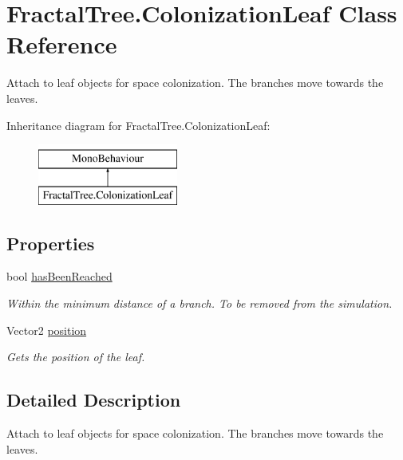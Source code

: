 \hypertarget{class_fractal_tree_1_1_colonization_leaf}{}\section{Fractal\+Tree.\+Colonization\+Leaf Class Reference}
\label{class_fractal_tree_1_1_colonization_leaf}


Attach to leaf objects for space colonization. The branches move towards the leaves.  


Inheritance diagram for Fractal\+Tree.\+Colonization\+Leaf\+:\begin{figure}[H]
\begin{center}
\leavevmode
\includegraphics[height=2.000000cm]{class_fractal_tree_1_1_colonization_leaf}
\end{center}
\end{figure}
\subsection*{Properties}
\begin{DoxyCompactItemize}
\item 
bool \hyperlink{class_fractal_tree_1_1_colonization_leaf_ad45a7ad00f87add9c92cd78047e892aa}{has\+Been\+Reached}
\begin{DoxyCompactList}\small\item\em Within the minimum distance of a branch. To be removed from the simulation. \end{DoxyCompactList}\item 
Vector2 \hyperlink{class_fractal_tree_1_1_colonization_leaf_a3e33ba00c3c7536f51f7f0c71487a091}{position}
\begin{DoxyCompactList}\small\item\em Gets the position of the leaf. \end{DoxyCompactList}\end{DoxyCompactItemize}


\subsection{Detailed Description}
Attach to leaf objects for space colonization. The branches move towards the leaves. 



